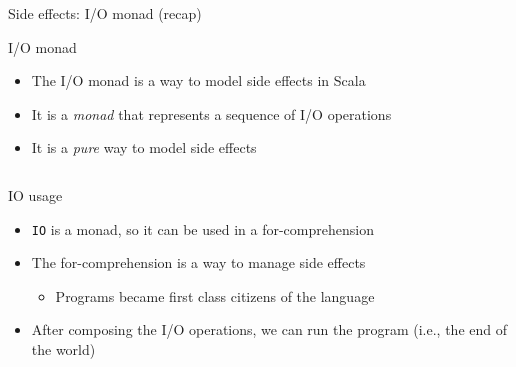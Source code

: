 \documentclass[presentation, 10pt]{beamer}\mode<presentation>{\usetheme{AMSBolognaFC}}
\begin{document}
\begin{frame}[fragile]{Side effects: I/O monad (recap)}
\begin{exampleblock}{I/O monad}
	\begin{itemize}
		\item The I/O monad is a way to model side effects in Scala
		\item It is a \emph{monad} that represents a sequence of I/O operations
		\item It is a \emph{pure} way to model side effects
	\end{itemize}
\end{exampleblock}
\inputminted[firstline=6,lastline=17]{scala}{code/src/main/scala/scala/monads/IO.scala}
\end{frame}

\begin{frame}{IO usage}
\begin{itemize}
	\item \texttt{IO} is a monad, so it can be used in a for-comprehension
	\item The for-comprehension is a way to manage side effects
	\begin{itemize}
		\item Programs became first class citizens of the language
	\end{itemize}
	\item After composing the I/O operations, we can run the program (i.e., the end of the world)
\end{itemize}
\inputminted[firstline=42,lastline=48]{scala}{code/src/main/scala/scala/monads/IO.scala}
\end{frame}
\end{document}
